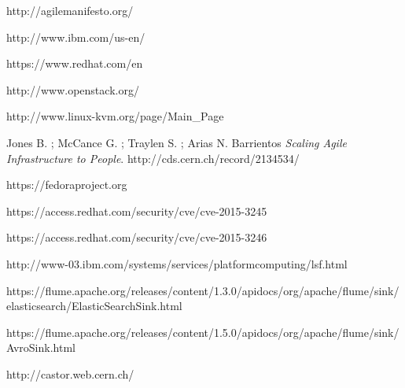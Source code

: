 
\begin{thebibliography}{90}
\rhead[\fancyplain{}{\bfseries \leftmark}]{\fancyplain{}{\bfseries
\thepage}}

http://agilemanifesto.org/

http://www.ibm.com/us-en/

https://www.redhat.com/en

http://www.openstack.org/

http://www.linux-kvm.org/page/Main\_Page

Jones B. ; McCance G. ; Traylen S. ; Arias N. Barrientos 
\textit{Scaling Agile Infrastructure to People}.
http://cds.cern.ch/record/2134534/

https://fedoraproject.org

https://access.redhat.com/security/cve/cve-2015-3245

https://access.redhat.com/security/cve/cve-2015-3246

http://www-03.ibm.com/systems/services/platformcomputing/lsf.html

https://flume.apache.org/releases/content/1.3.0/apidocs/org/apache/flume/sink/elasticsearch/ElasticSearchSink.html

https://flume.apache.org/releases/content/1.5.0/apidocs/org/apache/flume/sink/AvroSink.html

http://castor.web.cern.ch/



\end{thebibliography}
